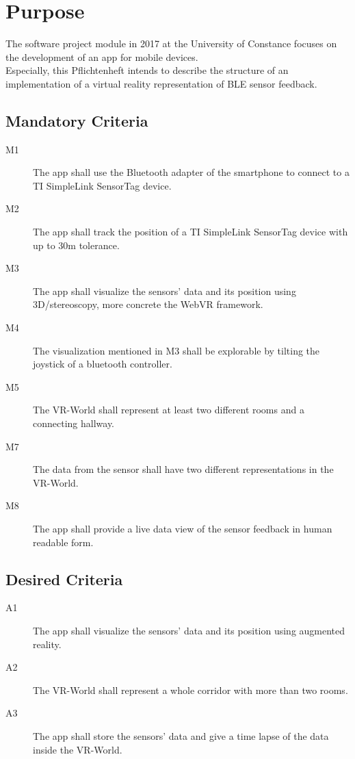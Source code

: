 \section{Purpose}
The software project module in 2017 at the University of Constance focuses on the development of an app for mobile devices. \\
Especially, this Pflichtenheft intends to describe the structure of an implementation of a virtual reality representation of BLE sensor feedback.

\subsection{Mandatory Criteria}

\begin{description}
  \item[M1] The app shall use the Bluetooth adapter of the smartphone to connect to a TI SimpleLink SensorTag device.
  \item[M2] The app shall track the position of a TI SimpleLink SensorTag device with up to 30m tolerance.
  \item[M3] The app shall visualize the sensors' data and its position using 3D/stereoscopy, more concrete the WebVR framework.
  \item[M4] The visualization mentioned in M3 shall be explorable by tilting the joystick of a bluetooth controller.
  \item[M5] The VR-World shall represent at least two different rooms and a connecting hallway.
  \item[M7] The data from the sensor shall have two different representations in the VR-World.
  \item[M8] The app shall provide a live data view of the sensor feedback in human readable form.

\end{description}

\subsection{Desired Criteria}

\begin{description}
  \item[A1] The app shall visualize the sensors' data and its position using augmented reality.
  \item[A2] The VR-World shall represent a whole corridor with more than two rooms.
  \item[A3] The app shall store the sensors' data and give a time lapse of the data inside the VR-World.
\end{description}
